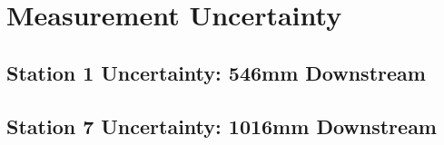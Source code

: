 
\chapter{Measurement Uncertainty}


\section{Station 1 Uncertainty: 546mm Downstream}

\pagebreak










\section{Station 7 Uncertainty: 1016mm Downstream}
\pagebreak



